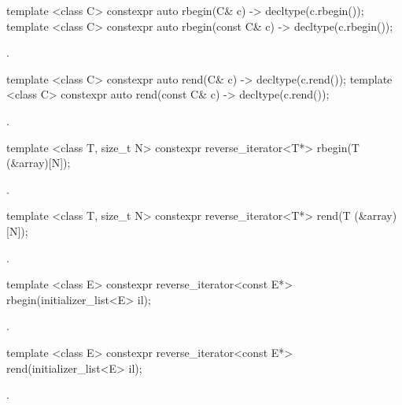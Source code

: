 %
\begin{itemdecl}
template <class C> constexpr auto rbegin(C& c) -> decltype(c.rbegin());
template <class C> constexpr auto rbegin(const C& c) -> decltype(c.rbegin());
\end{itemdecl}
\begin{itemdescr}
\pnum \returns {}.
\end{itemdescr}

%
\begin{itemdecl}
template <class C> constexpr auto rend(C& c) -> decltype(c.rend());
template <class C> constexpr auto rend(const C& c) -> decltype(c.rend());
\end{itemdecl}
\begin{itemdescr}
\pnum \returns {}.
\end{itemdescr}

%
\begin{itemdecl}
template <class T, size_t N> constexpr reverse_iterator<T*> rbegin(T (&array)[N]);
\end{itemdecl}
\begin{itemdescr}
\pnum \returns {}.
\end{itemdescr}

%
\begin{itemdecl}
template <class T, size_t N> constexpr reverse_iterator<T*> rend(T (&array)[N]);
\end{itemdecl}
\begin{itemdescr}
\pnum \returns {}.
\end{itemdescr}

%
\begin{itemdecl}
template <class E> constexpr reverse_iterator<const E*> rbegin(initializer_list<E> il);
\end{itemdecl}
\begin{itemdescr}
\pnum \returns {}.
\end{itemdescr}

%
\begin{itemdecl}
template <class E> constexpr reverse_iterator<const E*> rend(initializer_list<E> il);
\end{itemdecl}
\begin{itemdescr}
\pnum \returns {}.
\end{itemdescr}

